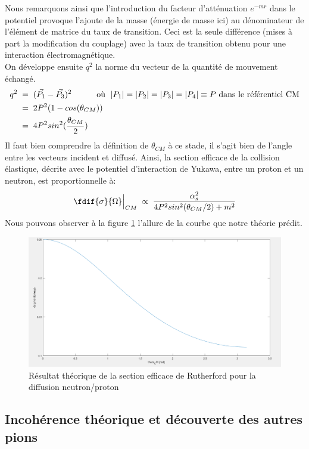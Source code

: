Nous remarquons ainsi que l'introduction du facteur d'atténuation $e^{-mr}$ dans le potentiel provoque l'ajoute de la masse (énergie de masse ici) au dénominateur de l'élément de matrice du taux de transition. Ceci est la seule différence (mises à part la modification du couplage) avec la taux de transition obtenu pour une interaction électromagnétique.\\
On développe ensuite $q^2$ la norme du vecteur de la quantité de mouvement échangé.
\begin{align*}
    q^2 &\; = \; (\Vec{P_1} - \Vec{P_3})^2 \qquad \quad \text{où }\; |P_1| = |P_2| = |P_3| = |P_4| \equiv P \text{ dans le référentiel CM}\\
    &\; = \; 2P^2(1-cos(\theta_{CM}))\\
    &\; = \; 4P^2sin^2(\dfrac{\theta_{CM}}{2})
\end{align*}
Il faut bien comprendre la définition de $\theta_{CM}$ à ce stade, il s'agit bien de l'angle entre les vecteurs incident et diffusé. Ainsi, la section efficace de la collision élastique, décrite avec le potentiel d'interaction de Yukawa, entre un proton et un neutron, est proportionnelle à:
\begin{equation*}
    \fdif{\sigma}{\Omega}\Big|_{CM} 
    \; \propto \; \dfrac{\alpha_s^2}{4P^2sin^2(\theta_{CM}/2) + m^2}
\end{equation*}
Nous pouvons observer à la figure \ref{sect_eff_diff_np_th} l'allure de la courbe que notre théorie prédit.
\begin{figure}[H]
    \centering
    \includegraphics[scale = 0.3]{Images4/Diffusion2.PNG}
    \caption{Résultat théorique de la section efficace de Rutherford pour la diffusion neutron/proton}
    \label{sect_eff_diff_np_th}
\end{figure}


\subsection{Incohérence théorique et découverte des autres pions}


